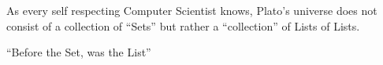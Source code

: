 
As every self respecting Computer Scientist knows, Plato's universe does not
consist of a collection of ``Sets'' but rather a ``collection'' of Lists of
Lists.

``Before the Set, was the List''

